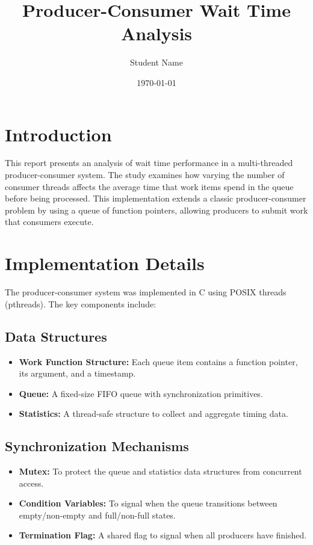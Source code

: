 \documentclass[12pt,a4paper]{article}
\title{Producer-Consumer Wait Time Analysis}
\author{Student Name}
\date{\today}
\begin{document}
\maketitle

\section{Introduction}

This report presents an analysis of wait time performance in a multi-threaded producer-consumer system. The study examines how varying the number of consumer threads affects the average time that work items spend in the queue before being processed. This implementation extends a classic producer-consumer problem by using a queue of function pointers, allowing producers to submit work that consumers execute.

\section{Implementation Details}

The producer-consumer system was implemented in C using POSIX threads (pthreads). The key components include:

\subsection{Data Structures}

\begin{itemize}
  \item \textbf{Work Function Structure:} Each queue item contains a function pointer, its argument, and a timestamp.
  \item \textbf{Queue:} A fixed-size FIFO queue with synchronization primitives.
  \item \textbf{Statistics:} A thread-safe structure to collect and aggregate timing data.
\end{itemize}

\subsection{Synchronization Mechanisms}

\begin{itemize}
  \item \textbf{Mutex:} To protect the queue and statistics data structures from concurrent access.
  \item \textbf{Condition Variables:} To signal when the queue transitions between empty/non-empty and full/non-full states.
  \item \textbf{Termination Flag:} A shared flag to signal when all producers have finished.
\end{itemize}
\end{document}
